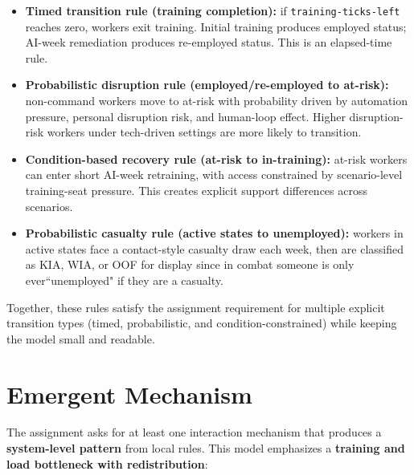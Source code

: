 \documentclass[11pt,letterpaper]{article}
\begin{document}
\begin{itemize}[leftmargin=*]
  \item \textbf{Timed transition rule (training completion):} if \texttt{training-ticks-left} reaches zero, workers exit training. Initial training produces employed status; AI-week remediation produces re-employed status. This is an elapsed-time rule.
  \item \textbf{Probabilistic disruption rule (employed/re-employed to at-risk):} non-command workers move to at-risk with probability driven by automation pressure, personal disruption risk, and human-loop effect. Higher disruption-risk workers under tech-driven settings are more likely to transition.
  \item \textbf{Condition-based recovery rule (at-risk to in-training):} at-risk workers can enter short AI-week retraining, with access constrained by scenario-level training-seat pressure. This creates explicit support differences across scenarios.
  \item \textbf{Probabilistic casualty rule (active states to unemployed):} workers in active states face a contact-style casualty draw each week, then are classified as KIA, WIA, or OOF for display since in combat someone is only ever``unemployed" if they are a casualty.
\end{itemize}

Together, these rules satisfy the assignment requirement for multiple explicit transition types (timed, probabilistic, and condition-constrained) while keeping the model small and readable.

\section{Emergent Mechanism}

The assignment asks for at least one interaction mechanism that produces a \textbf{system-level pattern} from local rules. This model emphasizes a \textbf{training and load bottleneck with redistribution}:
\end{document}
